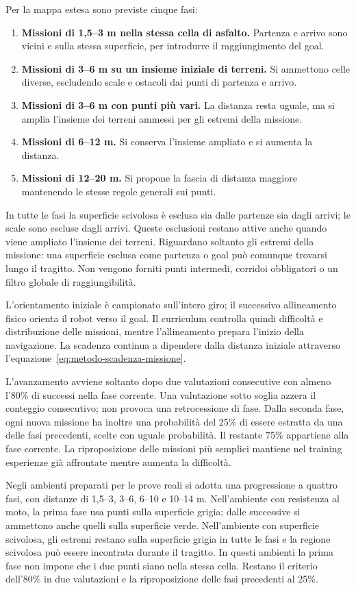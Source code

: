 Per la mappa estesa sono previste cinque fasi:
\begin{enumerate}
    \item \textbf{Missioni di 1,5--3 m nella stessa cella di asfalto.} Partenza e arrivo sono vicini e sulla stessa superficie, per introdurre il raggiungimento del goal.
    \item \textbf{Missioni di 3--6 m su un insieme iniziale di terreni.} Si ammettono celle diverse, escludendo scale e ostacoli dai punti di partenza e arrivo.
    \item \textbf{Missioni di 3--6 m con punti più vari.} La distanza resta uguale, ma si amplia l'insieme dei terreni ammessi per gli estremi della missione.
    \item \textbf{Missioni di 6--12 m.} Si conserva l'insieme ampliato e si aumenta la distanza.
    \item \textbf{Missioni di 12--20 m.} Si propone la fascia di distanza maggiore mantenendo le stesse regole generali sui punti.
\end{enumerate}

In tutte le fasi la superficie scivolosa è esclusa sia dalle partenze sia dagli arrivi; le scale sono escluse dagli arrivi. Queste esclusioni restano attive anche quando viene ampliato l'insieme dei terreni. Riguardano soltanto gli estremi della missione: una superficie esclusa come partenza o goal può comunque trovarsi lungo il tragitto. Non vengono forniti punti intermedi, corridoi obbligatori o un filtro globale di raggiungibilità.

L'orientamento iniziale è campionato sull'intero giro; il successivo allineamento fisico orienta il robot verso il goal. Il curriculum controlla quindi difficoltà e distribuzione delle missioni, mentre l'allineamento prepara l'inizio della navigazione. La scadenza continua a dipendere dalla distanza iniziale attraverso l'equazione~\eqref{eq:metodo-scadenza-missione}.

L'avanzamento avviene soltanto dopo due valutazioni consecutive con almeno l'80\% di successi nella fase corrente. Una valutazione sotto soglia azzera il conteggio consecutivo; non provoca una retrocessione di fase. Dalla seconda fase, ogni nuova missione ha inoltre una probabilità del 25\% di essere estratta da una delle fasi precedenti, scelte con uguale probabilità. Il restante 75\% appartiene alla fase corrente. La riproposizione delle missioni più semplici mantiene nel training esperienze già affrontate mentre aumenta la difficoltà.

Negli ambienti preparati per le prove reali si adotta una progressione a quattro fasi, con distanze di 1,5--3, 3--6, 6--10 e 10--14 m. Nell'ambiente con resistenza al moto, la prima fase usa punti sulla superficie grigia; dalle successive si ammettono anche quelli sulla superficie verde. Nell'ambiente con superficie scivolosa, gli estremi restano sulla superficie grigia in tutte le fasi e la regione scivolosa può essere incontrata durante il tragitto. In questi ambienti la prima fase non impone che i due punti siano nella stessa cella. Restano il criterio dell'80\% in due valutazioni e la riproposizione delle fasi precedenti al 25\%.

